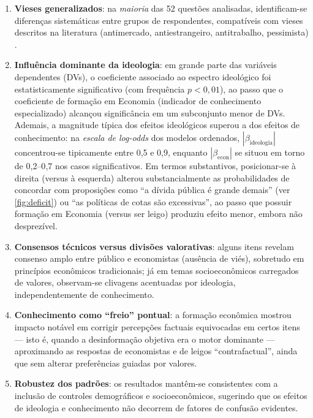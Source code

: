 \begin{enumerate}[label=\alph*)]

    \item \textbf{Vieses generalizados}: na \textit{maioria} das 52 questões analisadas, identificam-se diferenças sistemáticas entre grupos de respondentes, compatíveis com vieses descritos na literatura (antimercado, antiestrangeiro, antitrabalho, pessimista) \cite{The_Myth_of_the_Rational_Voter}.

    \item \textbf{Influência dominante da ideologia}: em grande parte das variáveis dependentes (DVs), o coeficiente associado ao espectro ideológico foi estatisticamente significativo (com frequência \(p<0{,}01\)), ao passo que o coeficiente de formação em Economia (indicador de conhecimento especializado) alcançou significância em um subconjunto menor de DVs. Ademais, a magnitude típica dos efeitos ideológicos superou a dos efeitos de conhecimento: na \textit{escala de log-odds} dos modelos ordenados, \(|\beta_{\text{ideologia}}|\) concentrou-se tipicamente entre 0{,}5 e 0{,}9, enquanto \(|\beta_{\text{econ}}|\) se situou em torno de 0{,}2–0{,}7 nos casos significativos. Em termos substantivos, posicionar-se à direita (versus à esquerda) alterou substancialmente as probabilidades de concordar com proposições como “a dívida pública é grande demais” (ver \autoref{fig:deficit}) ou “as políticas de cotas são excessivas”, ao passo que possuir formação em Economia (versus ser leigo) produziu efeito menor, embora não desprezível.
    
    \item \textbf{Consensos técnicos versus divisões valorativas}: alguns itens revelam consenso amplo entre público e economistas (ausência de viés), sobretudo em princípios econômicos tradicionais; já em temas socioeconômicos carregados de valores, observam-se clivagens acentuadas por ideologia, independentemente de conhecimento.
    
    \item \textbf{Conhecimento como “freio” pontual}: a formação econômica mostrou impacto notável em corrigir percepções factuais equivocadas em certos itens — isto é, quando a desinformação objetiva era o motor dominante — aproximando as respostas de economistas e de leigos “contrafactual”, ainda que sem alterar preferências guiadas por valores.
    
    \item \textbf{Robustez dos padrões}: os resultados mantêm-se consistentes com a inclusão de controles demográficos e socioeconômicos, sugerindo que os efeitos de ideologia e conhecimento não decorrem de fatores de confusão evidentes.
\end{enumerate}

